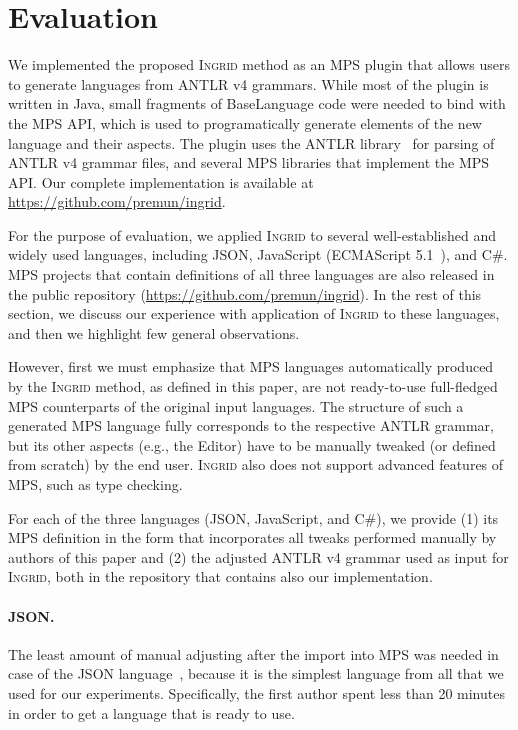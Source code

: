 \section{Evaluation}
\label{sect:EVAL}

We implemented the proposed \textsc{Ingrid} method as an MPS plugin that allows users to generate languages from ANTLR v4 grammars.
While most of the plugin is written in Java, small fragments of BaseLanguage code were needed to bind with the MPS API, which is used to programatically generate elements of the new language and their aspects.
The plugin uses the ANTLR library~\cite{ref:ANTLR} for parsing of ANTLR v4 grammar files, and several MPS libraries that implement the MPS API.
Our complete implementation is available at \url{https://github.com/premun/ingrid}.

For the purpose of evaluation, we applied \textsc{Ingrid} to several well-established and widely used languages, including JSON, JavaScript (ECMAScript 5.1~\cite{ref:ECMASCRIPT51}), and C\#.
MPS projects that contain definitions of all three languages are also released in the public repository (\url{https://github.com/premun/ingrid}).
In the rest of this section, we discuss our experience with application of \textsc{Ingrid} to these languages, and then we highlight few general observations.

However, first we must emphasize that MPS languages automatically produced by the \textsc{Ingrid} method, as defined in this paper, are not ready-to-use full-fledged MPS counterparts of the original input languages.
The structure of such a generated MPS language fully corresponds to the respective ANTLR grammar, but its other aspects (e.g., the Editor) have to be manually tweaked (or defined from scratch) by the end user.
\textsc{Ingrid} also does not support advanced features of MPS, such as type checking.

For each of the three languages (JSON, JavaScript, and C\#), we provide (1) its MPS definition in the form that incorporates all tweaks performed manually by authors of this paper and (2) the adjusted ANTLR v4 grammar used as input for \textsc{Ingrid}, both in the repository that contains also our implementation.

\paragraph{JSON.}
The least amount of manual adjusting after the import into MPS was needed in case of the JSON language~\cite{ref:JSON}, because it is the simplest language from all that we used for our experiments.
Specifically, the first author spent less than 20 minutes in order to get a language that is ready to use.

